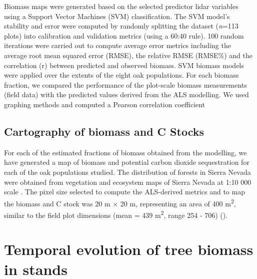 Biomass maps were generated based on the selected predictor lidar variables using a Support Vector Machines (SVM) classification. The SVM model’s stability and error were computed by randomly splitting the dataset (\emph{n}=113 plots) into calibration and validation metrics (using a 60:40 rule). 100 random iterations were carried out to compute average error metrics including the average root mean squared error (RMSE), the relative RMSE (RMSE\%) and the correlation (r) between predicted and observed biomass. SVM biomass models were applied over the extents of the eight oak populations. For each biomass fraction, we compared the performance of the plot-scale biomass measurements (field data) with the predicted values derived from the ALS modelling. We used graphing methods and computed a Pearson correlation coefficient

\subsection{Cartography of biomass and C Stocks}\label{sec:carbon:mat-cmpas}
For each of the estimated fractions of biomass obtained from the modelling, we have generated a map of biomass and potential carbon dioxide sequestration for each of the oak populations studied. The distribution of \Qp forests in Sierra Nevada were obtained from vegetation and ecosystem maps of Sierra Nevada at 1:10 000 scale \autocite{CMAOT2014CartografiaEvaluacion,PerezLuqueetal2019MapEcosystems}. The pixel size selected to compute the ALS-derived metrics and to map the biomass and C stock was 20 m × 20 m, representing an area of 400 m\textsuperscript{2}, similar to the field plot dimensions (mean = 439 m\textsuperscript{2}, range 254 - 706) ().

\section{Temporal evolution of tree biomass in \Qp stands}\label{sec:carbon:mat-temporal}

